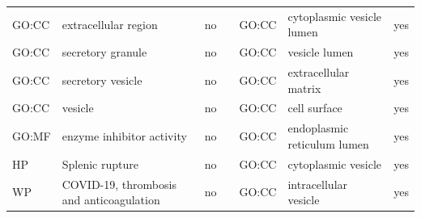 \begin{longtable}{@{}lp{5cm}lllp{5cm}l@{}}
GO:CC           & extracellular region                                                                                                               & no               &           & GO:CC           & cytoplasmic vesicle lumen                                                                                                                                              & yes              \\
GO:CC           & secretory granule                                                                                                                  & no               &           & GO:CC           & vesicle lumen                                                                                                                                                          & yes              \\
GO:CC           & secretory vesicle                                                                                                                  & no               &           & GO:CC           & extracellular matrix                                                                                                                                                   & yes              \\
GO:CC           & vesicle                                                                                                                            & no               &           & GO:CC           & cell surface                                                                                                                                                           & yes              \\
GO:MF           & enzyme inhibitor activity                                                                                                          & no               &           & GO:CC           & endoplasmic reticulum lumen                                                                                                                                            & yes              \\
HP              & Splenic rupture                                                                                                                    & no               &           & GO:CC           & cytoplasmic vesicle                                                                                                                                                    & yes              \\
WP              & COVID-19, thrombosis and anticoagulation                                                                                           & no               &           & GO:CC           & intracellular vesicle                                                                                                                                                  & yes              \\

\end{longtable}
